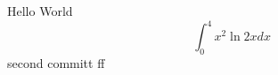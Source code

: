 \documentclass{article}
\begin{document}
Hello World
$$\int_0^4 x^2 \ln{2x}dx$$
second committ  ff
\end{document}
